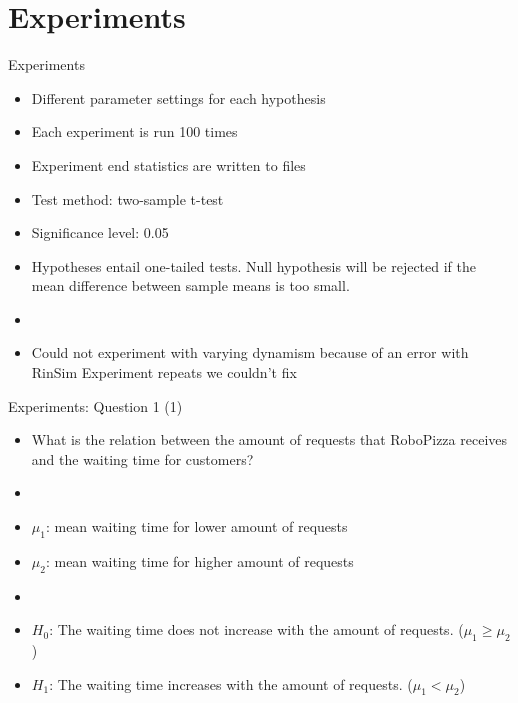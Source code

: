 \section{Experiments}

\begin{frame}{Experiments}
    \begin{itemize}
        \item Different parameter settings for each hypothesis
        \item Each experiment is run 100 times
        \item Experiment end statistics are written to files
        \item Test method: two-sample t-test %
        \item Significance level: 0.05
        \item Hypotheses entail one-tailed tests. Null hypothesis will be rejected if the mean difference between sample means is too small.

        \item[]
        \item Could not experiment with varying dynamism because of an error with RinSim Experiment repeats we couldn't fix
    \end{itemize}
\end{frame}


\begin{frame}{Experiments: Question 1 (1)}
    \begin{itemize}
        \item What is the relation between the amount of requests that RoboPizza receives and the waiting time for customers?
        \item[]
        \item $\mu_1$: mean waiting time for lower amount of requests
        \item $\mu_2$: mean waiting time for higher amount of requests
        \item[]
        \item $H_0$: The waiting time does not increase with the amount of requests. ($\mu_1 \geq \mu_2$)
        \item $H_1$: The waiting time increases with the amount of requests. ($\mu_1 < \mu_2$)
    \end{itemize}
\end{frame}


